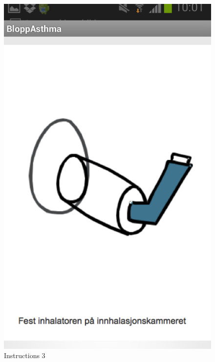 \begin{figure}[H]
\begin{minipage}[b]{0.3\linewidth}
		\includegraphics[width=0.20\paperwidth]{Pictures/app-screenshots/instructions-3.png}
		\caption{Instructions 3}
		\label{fig:instructions-3}
	\end{minipage}
	

\end{figure}

